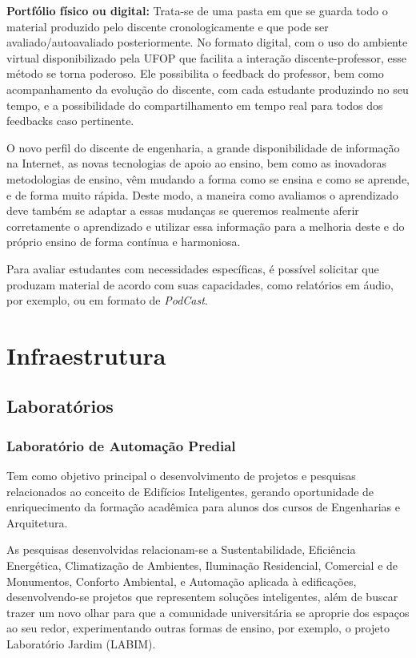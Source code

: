 \documentclass[
	12pt,				%
	openright,			%
	oneside,			%
	a4paper,			%
	english,			%
	brazil				%
	]{abntex2}
\begin{document}
\noindent \textbf{Portfólio físico ou digital:} Trata-se de uma pasta em que se guarda todo o material produzido pelo discente cronologicamente e que pode ser avaliado/autoavaliado posteriormente. No formato digital, com o uso do ambiente virtual disponibilizado pela UFOP que facilita a interação discente-professor, esse método se torna poderoso. Ele possibilita o feedback do professor, bem como acompanhamento da evolução do discente, com cada estudante produzindo no seu tempo, e a possibilidade do compartilhamento em tempo real para todos dos feedbacks caso pertinente.

O novo perfil do discente de engenharia, a grande disponibilidade de informação na Internet, as novas tecnologias de apoio ao ensino, bem como as inovadoras metodologias de ensino, vêm mudando a forma como se ensina e como se aprende, e de forma muito rápida. Deste modo, a maneira como avaliamos o aprendizado deve também se adaptar a essas mudanças se queremos realmente aferir corretamente o aprendizado e utilizar essa informação para a melhoria deste e do próprio ensino de forma contínua e harmoniosa.

Para avaliar estudantes com necessidades específicas, é possível solicitar que produzam material de acordo com suas capacidades, como relatórios em áudio, por exemplo, ou em formato de \textit{PodCast}.

\chapter{Infraestrutura}
\label{cap:07} 
%
\section{Laboratórios}
\subsection*{Laboratório de Automação Predial}

Tem como objetivo principal o desenvolvimento de projetos e pesquisas relacionados ao conceito de Edifícios Inteligentes, gerando oportunidade de enriquecimento da formação acadêmica para alunos dos cursos de Engenharias e Arquitetura.

As pesquisas desenvolvidas relacionam-se a Sustentabilidade, Eficiência Energética, Climatização de Ambientes, Iluminação Residencial, Comercial e de Monumentos, Conforto Ambiental, e Automação aplicada à edificações, desenvolvendo-se projetos que representem soluções inteligentes, além de buscar trazer um novo olhar para que a comunidade universitária se aproprie dos espaços ao seu redor, experimentando outras formas de ensino, por exemplo, o projeto Laboratório Jardim (LABIM).
\end{document}
